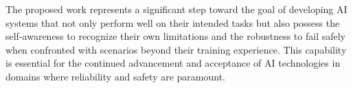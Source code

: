 \documentclass[11pt, oneside]{book}
\theoremstyle{plain}
\theoremstyle{definition}
\theoremstyle{remark}
\begin{document}
The proposed work represents a significant step toward the goal of developing AI systems that not only perform well on their intended tasks but also possess the self-awareness to recognize their own limitations and the robustness to fail safely when confronted with scenarios beyond their training experience. This capability is essential for the continued advancement and acceptance of AI technologies in domains where reliability and safety are paramount.






\begin{appendices}

\end{appendices}
\end{document}

